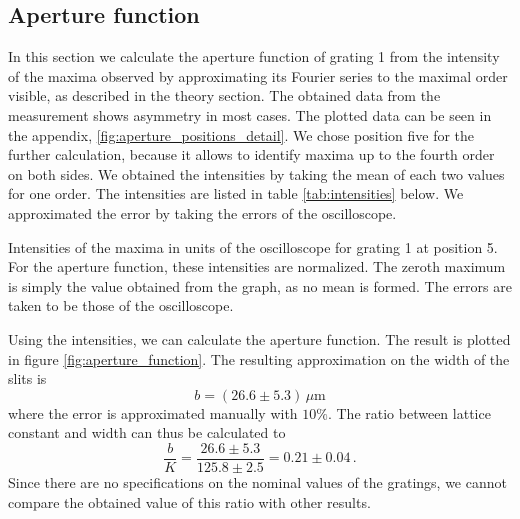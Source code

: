 \subsection{Aperture function}
In this section we calculate the aperture function of grating 1 from the intensity 
of the maxima observed by approximating its Fourier series to the maximal 
order visible, as described in the theory section. The obtained data from the measurement 
shows asymmetry in most cases. The plotted data can be seen in the appendix, 
\ref{fig:aperture_positions_detail}. We chose position five for the further calculation, 
because it allows to identify maxima up to the fourth order on both sides. 
We obtained the intensities by taking the mean of each two values for one order. 
The intensities are listed in table \ref{tab:intensities} below. We 
approximated the error by taking the errors of the oscilloscope. 
\begin{table}[H]
    \centering
    
    \caption{
        Intensities of the maxima in units of the oscilloscope for grating 1 at position 5. 
        For the aperture function, 
        these intensities are normalized. The zeroth maximum is simply the value obtained 
        from the graph, as no mean is formed. The errors are taken to be those of the
        oscilloscope.
        }
    \label{tab:intensities}
\end{table}
Using the intensities, we can calculate the aperture function. 
The result is plotted in figure \ref{fig:aperture_function}. 
The resulting approximation on the width of the slits is 
\begin{equation}
	b = (26.6 \pm 5.3)\, \mu\mathrm{m}
\end{equation}
where the error is approximated manually with $10\%$. The ratio between 
lattice constant and width can thus be calculated to 
\begin{equation}
	\frac{b}{K} = \frac{ 26.6 \pm 5.3 }{ 125.8 \pm 2.5 } = 0.21 \pm 0.04 \, .
\end{equation}
Since there are no specifications on the nominal values of the gratings, we cannot 
compare the obtained value of this ratio with other results. 


